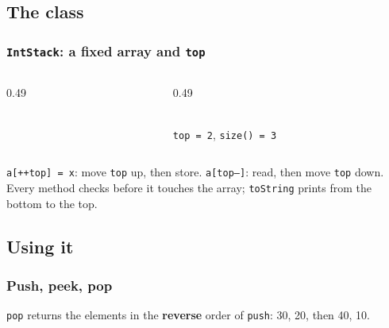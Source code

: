 \documentclass[aspectratio=169,10pt,compress]{beamer}
\begin{document}

\subsection[Class]{The class}




\begin{frame}[t,fragile] \frametitle{\texttt{IntStack}: a fixed array and \texttt{top}}
  \begin{columns}[T]
    \begin{column}{0.49\textwidth}
    \end{column}
    \begin{column}{0.49\textwidth}
      \begin{center}\\ \small \texttt{top = 2}, \texttt{size() = 3}\end{center}
    \end{column}
  \end{columns}
  \small \texttt{a[++top] = x}: move \texttt{top} up, then store. \texttt{a[top--]}: read, then move \texttt{top} down.
  Every method checks before it touches the array; \texttt{toString} prints from the bottom to the top.
\end{frame}

\subsection[Use]{Using it}




\begin{frame}[t,fragile] \frametitle{Push, peek, pop}

  \vspace{0.2em}
  \small \texttt{pop} returns the elements in the \textbf{reverse} order of \texttt{push}: 30, 20, then 40, 10.
\end{frame}
\end{document}
